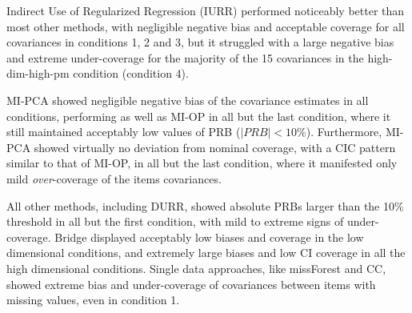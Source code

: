 \documentclass[11pt]{article}
\begin{document}
	Indirect Use of Regularized Regression (IURR) performed noticeably better than most other methods, 
	with negligible negative bias and acceptable coverage for all covariances in conditions 1, 2 and 3, 
	but it struggled with a large negative bias and extreme under-coverage for the majority of the 15 
	covariances in the high-dim-high-pm condition (condition 4).
	
	MI-PCA showed negligible negative bias of the covariance estimates in all conditions, performing as 
	well as MI-OP in all but the last condition, where it still maintained acceptably low values of PRB 
	($|PRB| < 10\%$).
	Furthermore, MI-PCA showed virtually no deviation from nominal coverage, with a CIC pattern similar to 
	that of MI-OP, in all but the last condition, where it manifested only mild \emph{over}-coverage of the 
	items covariances.

	All other methods, including DURR, showed absolute PRBs larger than the 10\% threshold in all but the 
	first condition, with mild to extreme signs of under-coverage.
	Bridge displayed acceptably low biases and coverage in the low dimensional conditions, and 
	extremely large biases and low CI coverage in all the high dimensional conditions.
	Single data approaches, like missForest and CC, showed extreme bias and under-coverage of covariances between 
	items with missing values, even in condition 1.
\end{document}
